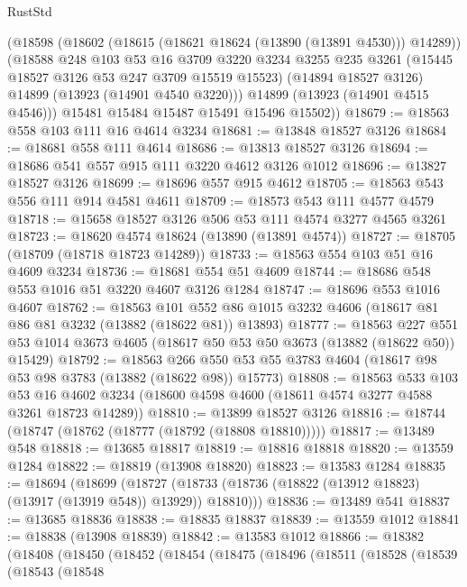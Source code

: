 \begin{lexlean}{RustStd}
\begin{coremodule}
        (@18598
          (@18602 (@18615 (@18621 @18624 (@13890 (@13891 @4530))) @14289))
          (@18588
            @248
            @103
            @53
            @16
            @3709
            @3220
            @3234
            @3255
            @235
            @3261
            (@15445 @18527 @3126 @53 @247 @3709 @15519 @15523)
            (@14894 @18527 @3126)
            @14899
            (@13923 (@14901 @4540 @3220)))
          @14899
          (@13923 (@14901 @4515 @4546)))
        @15481
        @15484
        @15487
        @15491
        @15496
        @15502))
@18679 := @18563 @558 @103 @111 @16 @4614 @3234
@18681 := @13848 @18527 @3126
@18684 := @18681 @558 @111 @4614
@18686 := @13813 @18527 @3126
@18694 := @18686 @541 @557 @915 @111 @3220 @4612 @3126 @1012
@18696 := @13827 @18527 @3126
@18699 := @18696 @557 @915 @4612
@18705 := @18563 @543 @556 @111 @914 @4581 @4611
@18709 := @18573 @543 @111 @4577 @4579
@18718 := @15658 @18527 @3126 @506 @53 @111 @4574 @3277 @4565 @3261
@18723 := @18620 @4574 @18624 (@13890 (@13891 @4574))
@18727 := @18705 (@18709 (@18718 @18723 @14289))
@18733 := @18563 @554 @103 @51 @16 @4609 @3234
@18736 := @18681 @554 @51 @4609
@18744 := @18686 @548 @553 @1016 @51 @3220 @4607 @3126 @1284
@18747 := @18696 @553 @1016 @4607
@18762 := @18563
    @101
    @552
    @86
    @1015
    @3232
    @4606
    (@18617 @81 @86 @81 @3232 (@13882 (@18622 @81)) @13893)
@18777 := @18563
    @227
    @551
    @53
    @1014
    @3673
    @4605
    (@18617 @50 @53 @50 @3673 (@13882 (@18622 @50)) @15429)
@18792 := @18563
    @266
    @550
    @53
    @55
    @3783
    @4604
    (@18617 @98 @53 @98 @3783 (@13882 (@18622 @98)) @15773)
@18808 := @18563
    @533
    @103
    @53
    @16
    @4602
    @3234
    (@18600 @4598 @4600 (@18611 @4574 @3277 @4588 @3261 @18723 @14289))
@18810 := @13899 @18527 @3126
@18816 := @18744 (@18747 (@18762 (@18777 (@18792 (@18808 @18810)))))
@18817 := @13489 @548
@18818 := @13685 @18817
@18819 := @18816 @18818
@18820 := @13559 @1284
@18822 := @18819 (@13908 @18820)
@18823 := @13583 @1284
@18835 := @18694
    (@18699
      (@18727 (@18733 (@18736 (@18822 (@13912 @18823) (@13917 (@13919 @548)) @13929)) @18810)))
@18836 := @13489 @541
@18837 := @13685 @18836
@18838 := @18835 @18837
@18839 := @13559 @1012
@18841 := @18838 (@13908 @18839)
@18842 := @13583 @1012
@18866 := @18382
    (@18408
      (@18450
        (@18452
          (@18454
            (@18475
              (@18496
                (@18511
                  (@18528
                    (@18539
                      (@18543
                        (@18548

\end{coremodule}
\end{lexlean}
